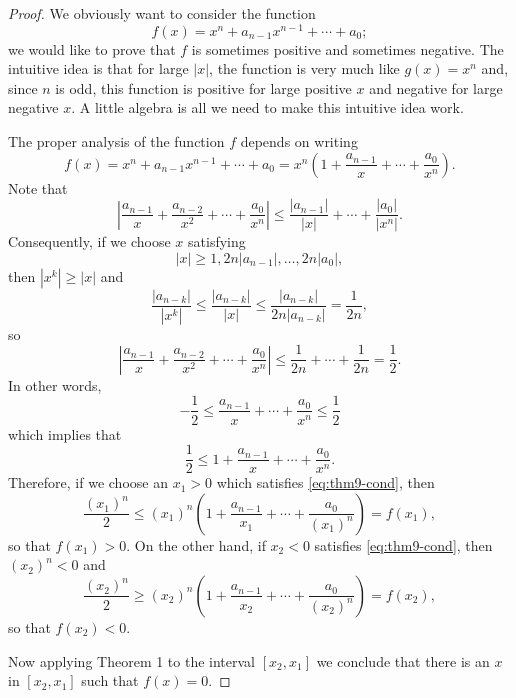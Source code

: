 \documentclass{article}
\begin{document}
\begin{proof}
  We obviously want to consider the function \begin{equation*}
    f(x) = x^n + a_{n-1}x^{n-1} + \cdots + a_0;
  \end{equation*}
  we would like to prove that $f$ is sometimes positive and sometimes negative.
  The intuitive idea is that for large $|x|$, the function is very much like
  $g(x) = x^n$ and, since $n$ is odd, this function is positive for large
  positive $x$ and negative for large negative $x$. A little algebra is all we
  need to make this intuitive idea work.

  The proper analysis of the function $f$ depends on writing \begin{equation*}
    f(x) = x^n + a_{n-1}x^{n-1} + \cdots + a_0 = x^n\left(1 + \frac{a_{n-1}}{x}
      + \cdots + \frac{a_0}{x^n}\right).
  \end{equation*}
  Note that \begin{equation*}
    \left|\frac{a_{n-1}}{x} + \frac{a_{n-2}}{x^2} + \cdots + \frac{a_0}{x^n}
      \right| \leq \frac{|a_{n-1}|}{|x|} + \cdots + \frac{|a_0|}{|x^n|}.
  \end{equation*}
  Consequently, if we choose $x$ satisfying \begin{equation}
    |x| \geq 1, 2n|a_{n-1}|, \ldots, 2n|a_0|, \label{eq:thm9-cond} \tag{*}
  \end{equation}
  then $|x^k| \geq |x|$ and \begin{equation*}
    \frac{|a_{n-k}|}{|x^k|} \leq \frac{|a_{n-k}|}{|x|} \leq \frac{|a_{n-k}|}{2n
    |a_{n-k}|} = \frac{1}{2n},
  \end{equation*}
  so \begin{equation*}
    \left|\frac{a_{n-1}}{x} + \frac{a_{n-2}}{x^2} + \cdots + \frac{a_0}{x^n}
      \right| \leq \frac{1}{2n} + \cdots + \frac{1}{2n} = \frac{1}{2}.
  \end{equation*}
  In other words, \begin{equation*}
    -\frac{1}{2} \leq \frac{a_{n-1}}{x} + \cdots + \frac{a_0}{x^n} \leq
      \frac{1}{2}
  \end{equation*}
  which implies that \begin{equation*}
    \frac{1}{2} \leq 1 + \frac{a_{n-1}}{x} + \cdots + \frac{a_0}{x^n}.
  \end{equation*}
  Therefore, if we choose an $x_1 > 0$ which satisfies \eqref{eq:thm9-cond},
  then \begin{equation*}
    \frac{(x_1)^n}{2} \leq (x_1)^n\left(1 + \frac{a_{n-1}}{x_1} + \cdots +
      \frac{a_0}{(x_1)^n}\right) = f(x_1),
  \end{equation*}
  so that $f(x_1) > 0$. On the other hand, if $x_2 < 0$ satisfies
  \eqref{eq:thm9-cond}, then $(x_2)^n < 0$ and \begin{equation*}
    \frac{(x_2)^n}{2} \geq (x_2)^n\left(1 + \frac{a_{n-1}}{x_2} + \cdots +
      \frac{a_0}{(x_2)^n}\right) = f(x_2),
  \end{equation*}
  so that $f(x_2) < 0$.

  Now applying Theorem 1 to the interval $[x_2, x_1]$ we conclude that there is
  an $x$ in $[x_2, x_1]$ such that $f(x) = 0$.
\end{proof}
\end{document}
